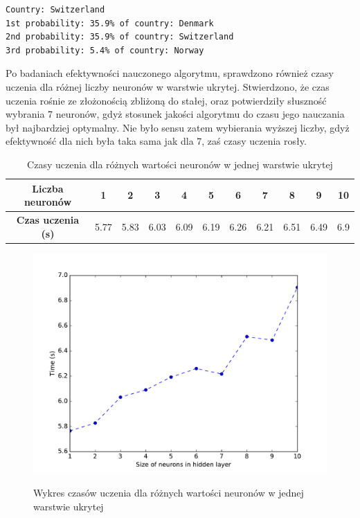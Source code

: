 \begin{lstlisting}[caption=Przykładowy rozkład pewności klas dla niepoprawnego wskazania Szwajcarii]
Country: Switzerland
1st probability: 35.9% of country: Denmark
2nd probability: 35.9% of country: Switzerland
3rd probability: 5.4% of country: Norway
\end{lstlisting}

Po badaniach efektywności nauczonego algorytmu, sprawdzono również czasy uczenia dla różnej liczby neuronów w warstwie ukrytej. Stwierdzono, że czas uczenia rośnie ze złożonością zbliżoną do stałej, oraz potwierdziły słuszność wybrania 7 neuronów, gdyż stosunek jakości algorytmu do czasu jego nauczania był najbardziej optymalny. Nie było sensu zatem wybierania wyższej liczby, gdyż efektywność dla nich była taka sama jak dla 7, zaś czasy uczenia rosły.

\begin{table}[ht!]
\centering
\caption{Czasy uczenia dla różnych wartości neuronów w jednej warstwie ukrytej}
\label{times}
\begin{tabular}{@{}|c|c|c|c|c|c|c|c|c|c|c|@{}}
\toprule
\textbf{Liczba neuronów}  & 1    & 2    & 3    & 4    & 5    & 6    & 7    & 8    & 9    & 10  \\ \midrule
\textbf{Czas uczenia (s)} & 5.77 & 5.83 & 6.03 & 6.09 & 6.19 & 6.26 & 6.21 & 6.51 & 6.49 & 6.9 \\ \bottomrule
\end{tabular}
\end{table}

\newpage

\begin{figure}[h!]
	\centering
	\includegraphics[width=0.90\linewidth]{times.pdf}
	\label{features}
	\caption{Wykres czasów uczenia dla różnych wartości neuronów w jednej warstwie ukrytej}
\end{figure}

